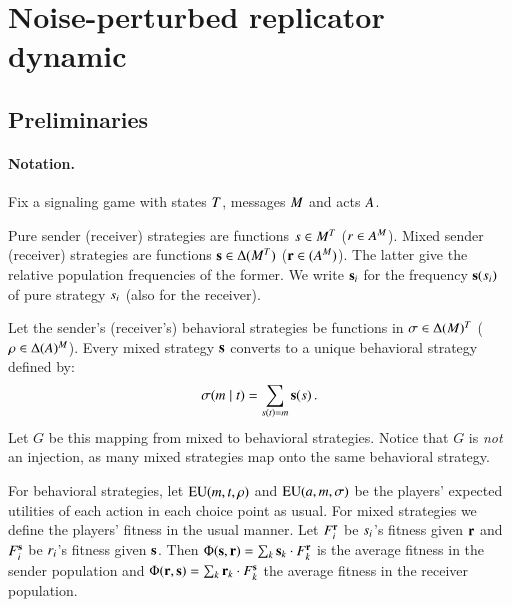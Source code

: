 \section{Noise-perturbed replicator dynamic}

\subsection{Preliminaries}

\paragraph{Notation.} Fix a signaling game with states $T$,
messages $M$ and acts $A$. %

Pure sender (receiver) strategies are functions $s \in
M^T$ ($r \in A^M$). Mixed sender (receiver)
strategies are functions $\mathrm{\mathbf{s}} \in \Delta(M^T)$
($\mathrm{\mathbf{r}} \in (A^M)$). The latter give the relative
population frequencies of the former. We write $\mathrm{\mathbf{s}}_i$ for the
frequency $\mathrm{\mathbf{s}}(s_i)$ of pure strategy $s_i$ (also for
the receiver).

Let the sender's (receiver's) behavioral strategies be functions in
$\sigma \in \Delta(M)^T$ ($\rho \in
\Delta(A)^M$). Every mixed strategy $\mathrm{\mathbf{s}}$ converts to a
unique behavioral strategy defined by:
\begin{align*}
  \sigma(m \mid t) = \sum_{s(t) = m} \mathrm{\mathbf{s}}(s)\,.
\end{align*} 
Let $G$ be this mapping from mixed to behavioral strategies. Notice
that $G$ is \emph{not} an injection, as many mixed strategies map onto
the same behavioral strategy.

For behavioral strategies, let $\mathrm{EU}(m, t, \rho)$ and
$\mathrm{EU}(a, m, \sigma)$ be the players' expected utilities of
each action in each choice point as usual. For mixed strategies we
define the players' fitness in the usual manner. Let $F_i^{\mathrm{\mathbf{r}}}$
be $s_i$'s fitness given $\mathrm{\mathbf{r}}$ and $F_i^{\mathrm{\mathbf{s}}}$ be
$r_i$'s fitness given $\mathrm{\mathbf{s}}$. Then $\Phi(\mathrm{\mathbf{s}},\mathrm{\mathbf{r}}) =
\sum_{k} \mathrm{\mathbf{s}}_k \cdot F_k^{\mathrm{\mathbf{r}}}$ is the average fitness in the
sender population and $\Phi(\mathrm{\mathbf{r}},\mathrm{\mathbf{s}}) = \sum_{k} \mathrm{\mathbf{r}}_k
\cdot F_k^{\mathrm{\mathbf{s}}}$ the average fitness in the receiver population.

